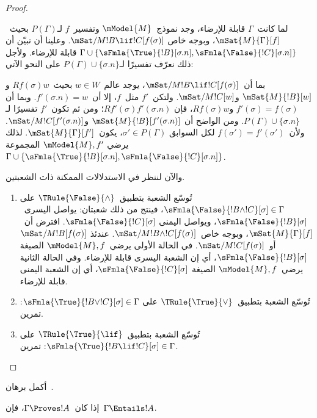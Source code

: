 \documentclass[../../../include/open-logic-section]{subfiles}
\begin{document}
\begin{proof}
\begin{enumerate}
  لما كانت~$\Gamma$ قابلة للإرضاء، وجد نموذج~$\mModel{M}$ وتفسير~$f$
  لـ$P(\Gamma)$ بحيث~$\mSat{M}{\Gamma}[f]$، وبوجه خاص
  $\mSat/{M}{!B \lif !C}[f(\sigma)]$. وعلينا أن نبيّن أن
  $\Gamma \cup \{\sFmla{\True}{!B}[\sigma.n],
  \sFmla{\False}{!C}[\sigma.n]\}$ قابلة للإرضاء. ولأجل ذلك نعرّف
  تفسيرًا لـ$P(\Gamma) \cup \{\sigma.n\}$ على النحو الآتي:

  بما أن~$\mSat/{M}{!B \lif !C}[f(\sigma)]$، يوجد عالم~$w \in W$
  بحيث~$Rf(\sigma)w$ و$\mSat{M}{!B}[w]$ و$\mSat/{M}{!C}[w]$.
  ولتكن~$f'$ مثل~$f$، إلا أن~$f'(\sigma.n) = w$. وبما أن
  $f'(\sigma) = f(\sigma)$ و$Rf(\sigma)w$، فإن
  $Rf'(\sigma)f'(\sigma.n)$؛ ومن ثم تكون~$f'$ تفسيرًا لـ
  $P(\Gamma) \cup \{\sigma.n\}$. ومن الواضح أن
  $\mSat{M}{!B}[f'(\sigma.n)]$ و$\mSat/{M}{!C}[f'(\sigma.n)]$.
  ولأن~$f(\sigma') = f'(\sigma')$ لكل السوابق
  $\sigma' \in P(\Gamma)$، يكون~$\mSat{M}{\Gamma}[f']$. لذلك يرضي
  $\mModel{M}, f'$ المجموعة
  $\Gamma \cup \{\sFmla{\True}{!B}[\sigma.n],
  \sFmla{\False}{!C}[\sigma.n]\}$.
\end{enumerate}
والآن لننظر في الاستدلالات الممكنة ذات الشعبتين.
\begin{enumerate}
\item تُوسّع الشعبة بتطبيق~$\TRule{\False}{\land}$ على
  $\sFmla{\False}{!B \land !C}[\sigma] \in \Gamma$، فينتج من ذلك
  شعبتان: يواصل اليسرى~$\sFmla{\False}{!B}[\sigma]$، ويواصل اليمنى
  $\sFmla{\False}{!C}[\sigma]$. افترض أن~$\mSat{M}{\Gamma}[f]$،
  وبوجه خاص~$\mSat/{M}{!B \land !C}[f(\sigma)]$. عندئذ
  $\mSat/{M}{!B}[f(\sigma)]$ أو~$\mSat/{M}{!C}[f(\sigma)]$.
  في الحالة الأولى يرضي~$\mModel{M}, f$ الصيغة
  $\sFmla{\False}{!B}[\sigma]$، أي إن الشعبة اليسرى قابلة للإرضاء.
  وفي الحالة الثانية يرضي~$\mModel{M}, f$ الصيغة
  $\sFmla{\False}{!C}[\sigma]$، أي إن الشعبة اليمنى قابلة للإرضاء.
\item تُوسّع الشعبة بتطبيق~$\TRule{\True}{\lor}$ على
    $\sFmla{\True}{!B \lor !C}[\sigma] \in \Gamma$: تمرين.
\item تُوسّع الشعبة بتطبيق~$\TRule{\True}{\lif}$ على
    $\sFmla{\True}{!B \lif !C}[\sigma] \in \Gamma$: تمرين.
\end{enumerate}
\end{proof}

\begin{prob}
أكمل برهان~.
\end{prob}

\begin{cor}
إذا كان~$\Gamma \Proves !A$، فإن~$\Gamma \Entails !A$.
\end{cor}
\end{document}
